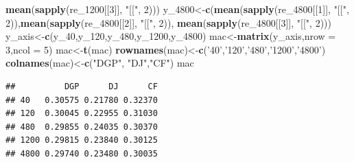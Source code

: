 \documentclass[
]{article}
\newenvironment{Shaded}{\begin{snugshade}}{\end{snugshade}}
\newcommand{\DataTypeTok}[1]{\textcolor[rgb]{0.13,0.29,0.53}{#1}}
\newcommand{\DecValTok}[1]{\textcolor[rgb]{0.00,0.00,0.81}{#1}}
\newcommand{\KeywordTok}[1]{\textcolor[rgb]{0.13,0.29,0.53}{\textbf{#1}}}
\newcommand{\NormalTok}[1]{#1}
\newcommand{\StringTok}[1]{\textcolor[rgb]{0.31,0.60,0.02}{#1}}
\begin{document}
\begin{Shaded}
\begin{Highlighting}[]
        \KeywordTok{mean}\NormalTok{(}\KeywordTok{sapply}\NormalTok{(re_}\DecValTok{1200}\NormalTok{[[}\DecValTok{3}\NormalTok{]], }\StringTok{"[["}\NormalTok{, }\DecValTok{2}\NormalTok{)))}
\NormalTok{y_}\DecValTok{4800}\NormalTok{<-}\KeywordTok{c}\NormalTok{(}\KeywordTok{mean}\NormalTok{(}\KeywordTok{sapply}\NormalTok{(re_}\DecValTok{4800}\NormalTok{[[}\DecValTok{1}\NormalTok{]], }\StringTok{"[["}\NormalTok{, }\DecValTok{2}\NormalTok{)),}\KeywordTok{mean}\NormalTok{(}\KeywordTok{sapply}\NormalTok{(re_}\DecValTok{4800}\NormalTok{[[}\DecValTok{2}\NormalTok{]], }\StringTok{"[["}\NormalTok{, }\DecValTok{2}\NormalTok{)),}
        \KeywordTok{mean}\NormalTok{(}\KeywordTok{sapply}\NormalTok{(re_}\DecValTok{4800}\NormalTok{[[}\DecValTok{3}\NormalTok{]], }\StringTok{"[["}\NormalTok{, }\DecValTok{2}\NormalTok{)))}
\NormalTok{y_axis<-}\KeywordTok{c}\NormalTok{(y_}\DecValTok{40}\NormalTok{,y_}\DecValTok{120}\NormalTok{,y_}\DecValTok{480}\NormalTok{,y_}\DecValTok{1200}\NormalTok{,y_}\DecValTok{4800}\NormalTok{)}
\NormalTok{mac<-}\KeywordTok{matrix}\NormalTok{(y_axis,}\DataTypeTok{nrow =} \DecValTok{3}\NormalTok{,}\DataTypeTok{ncol =} \DecValTok{5}\NormalTok{)}
\NormalTok{mac<-}\KeywordTok{t}\NormalTok{(mac)}
\KeywordTok{rownames}\NormalTok{(mac)<-}\KeywordTok{c}\NormalTok{(}\StringTok{'40'}\NormalTok{,}\StringTok{'120'}\NormalTok{,}\StringTok{'480'}\NormalTok{,}\StringTok{'1200'}\NormalTok{,}\StringTok{'4800'}\NormalTok{)}
\KeywordTok{colnames}\NormalTok{(mac)<-}\KeywordTok{c}\NormalTok{(}\StringTok{"DGP"}\NormalTok{, }\StringTok{"DJ"}\NormalTok{,}\StringTok{"CF"}\NormalTok{)}
\NormalTok{mac}
\end{Highlighting}
\end{Shaded}

\begin{verbatim}
##          DGP      DJ      CF
## 40   0.30575 0.21780 0.32370
## 120  0.30045 0.22955 0.31030
## 480  0.29855 0.24035 0.30370
## 1200 0.29815 0.23840 0.30125
## 4800 0.29740 0.23480 0.30035
\end{verbatim}
\end{document}
